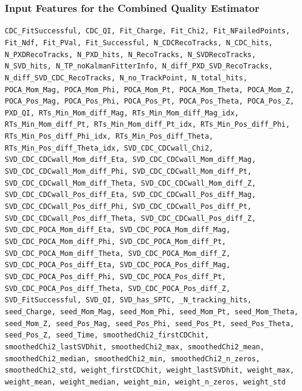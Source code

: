 \documentclass[18pt, aspectratio=169]{beamer}
\begin{document}
\begin{frame}
  \frametitle{Input Features for the Combined Quality Estimator}
  \texttt{\scriptsize CDC\_FitSuccessful, CDC\_QI, Fit\_Charge, Fit\_Chi2, Fit\_NFailedPoints,
    Fit\_Ndf, Fit\_PVal, Fit\_Successful, N\_CDCRecoTracks, N\_CDC\_hits, N\_PXDRecoTracks,
    N\_PXD\_hits, N\_RecoTracks, N\_SVDRecoTracks, N\_SVD\_hits, N\_TP\_noKalmanFitterInfo,
    N\_diff\_PXD\_SVD\_RecoTracks, N\_diff\_SVD\_CDC\_RecoTracks, N\_no\_TrackPoint, N\_total\_hits,
    POCA\_Mom\_Mag, POCA\_Mom\_Phi, POCA\_Mom\_Pt, POCA\_Mom\_Theta, POCA\_Mom\_Z, POCA\_Pos\_Mag,
    POCA\_Pos\_Phi, POCA\_Pos\_Pt, POCA\_Pos\_Theta, POCA\_Pos\_Z, PXD\_QI,
    RTs\_Min\_Mom\_diff\_Mag, RTs\_Min\_Mom\_diff\_Mag\_idx, RTs\_Min\_Mom\_diff\_Pt,
    RTs\_Min\_Mom\_diff\_Pt\_idx, RTs\_Min\_Pos\_diff\_Phi, RTs\_Min\_Pos\_diff\_Phi\_idx,
    RTs\_Min\_Pos\_diff\_Theta, RTs\_Min\_Pos\_diff\_Theta\_idx, SVD\_CDC\_CDCwall\_Chi2,
    SVD\_CDC\_CDCwall\_Mom\_diff\_Eta, SVD\_CDC\_CDCwall\_Mom\_diff\_Mag,
    SVD\_CDC\_CDCwall\_Mom\_diff\_Phi, SVD\_CDC\_CDCwall\_Mom\_diff\_Pt,
    SVD\_CDC\_CDCwall\_Mom\_diff\_Theta, SVD\_CDC\_CDCwall\_Mom\_diff\_Z,
    SVD\_CDC\_CDCwall\_Pos\_diff\_Eta, SVD\_CDC\_CDCwall\_Pos\_diff\_Mag,
    SVD\_CDC\_CDCwall\_Pos\_diff\_Phi, SVD\_CDC\_CDCwall\_Pos\_diff\_Pt,
    SVD\_CDC\_CDCwall\_Pos\_diff\_Theta, SVD\_CDC\_CDCwall\_Pos\_diff\_Z,
    SVD\_CDC\_POCA\_Mom\_diff\_Eta, SVD\_CDC\_POCA\_Mom\_diff\_Mag, SVD\_CDC\_POCA\_Mom\_diff\_Phi,
    SVD\_CDC\_POCA\_Mom\_diff\_Pt, SVD\_CDC\_POCA\_Mom\_diff\_Theta, SVD\_CDC\_POCA\_Mom\_diff\_Z,
    SVD\_CDC\_POCA\_Pos\_diff\_Eta, SVD\_CDC\_POCA\_Pos\_diff\_Mag, SVD\_CDC\_POCA\_Pos\_diff\_Phi,
    SVD\_CDC\_POCA\_Pos\_diff\_Pt, SVD\_CDC\_POCA\_Pos\_diff\_Theta, SVD\_CDC\_POCA\_Pos\_diff\_Z,
    SVD\_FitSuccessful, SVD\_QI, SVD\_has\_SPTC, \_N\_tracking\_hits, seed\_Charge, seed\_Mom\_Mag,
    seed\_Mom\_Phi, seed\_Mom\_Pt, seed\_Mom\_Theta, seed\_Mom\_Z, seed\_Pos\_Mag, seed\_Pos\_Phi,
    seed\_Pos\_Pt, seed\_Pos\_Theta, seed\_Pos\_Z, seed\_Time, smoothedChi2\_firstCDChit,
    smoothedChi2\_lastSVDhit, smoothedChi2\_max, smoothedChi2\_mean, smoothedChi2\_median,
    smoothedChi2\_min, smoothedChi2\_n\_zeros, smoothedChi2\_std, weight\_firstCDChit,
    weight\_lastSVDhit, weight\_max, weight\_mean, weight\_median, weight\_min, weight\_n\_zeros,
    weight\_std}
\end{frame}
\end{document}
